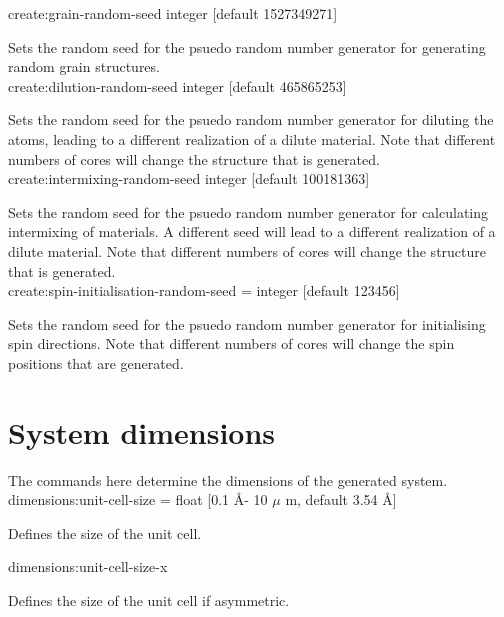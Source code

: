 {\zicf create:grain-random-seed integer [default 1527349271]}
Sets the random seed for the psuedo random number generator for generating random
grain structures. \\

{\zicf create:dilution-random-seed integer [default 465865253]}
Sets the random seed for the psuedo random number generator for diluting the
atoms, leading to a different realization of a dilute material. Note that
different numbers of cores will change the structure that is generated.\\

{\zicf create:intermixing-random-seed integer [default 100181363]}
Sets the random seed for the psuedo random number generator for calculating
intermixing of materials. A different seed will lead to a different realization
of a dilute material. Note that different numbers of cores will change the
structure that is generated.\\

{\zicf create:spin-initialisation-random-seed = integer [default 123456]}
Sets the random seed for the psuedo random number generator for initialising
spin directions. Note that different numbers of cores will change the
spin positions that are generated.\\

\section*{System dimensions}
The commands here determine the dimensions of the generated system.\\

{\zicf dimensions:unit-cell-size = float [0.1 \AA - 10 $\mu$ m, default 3.54 \AA]} Defines the size of the unit cell.\\ \par

{\zicf dimensions:unit-cell-size-x}
 Defines the size
of the unit cell if asymmetric.\\ \par

